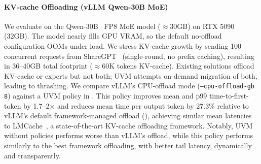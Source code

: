 \paragraph{KV-cache Offloading (vLLM Qwen-30B MoE)}
We evaluate \sys on the Qwen-30B~\cite{yang2025qwen3} FP8 MoE model ($\approx$30GB) on RTX 5090 (32GB).
The model nearly fills GPU VRAM, so the default no-offload configuration OOMs under load.
We stress KV-cache growth by sending 100 concurrent requests from ShareGPT~\cite{sharegpt} (single-round, no prefix caching), resulting in 36--40GB total footprint ($\approx$60K tokens KV-cache).
Existing solutions offload KV-cache or experts but not both; UVM attempts on-demand migration of both, leading to thrashing.
We compare vLLM's CPU-offload mode (\texttt{--cpu-offload-gb 8}) against a UVM policy in \sys{}.
This policy improves mean and p99 time-to-first-token by 1.7--2$\times$ and reduces mean time per output token by 27.3\% relative to vLLM's default framework-managed offload (), achieving similar mean latencies to LMCache~\cite{lmcache}, a state-of-the-art KV-cache offloading framework.
Notably, UVM without \sys policies performs worse than vLLM's offload, while this policy performs similarly to the best framework offloading, with better tail latency, dynamically and transparently.

